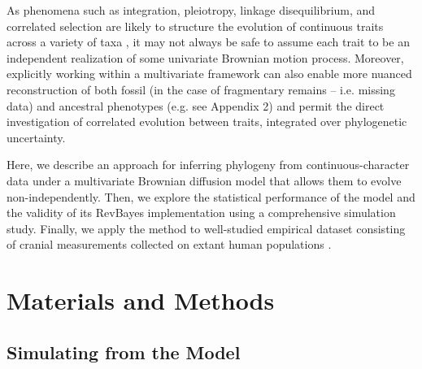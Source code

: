 \documentclass[10pt, twocolumn, twoside]{article}
\begin{document}
As phenomena such as integration, pleiotropy, linkage disequilibrium, and correlated selection are likely to structure the evolution of continuous traits \citep{cheverudDevelopmentalIntegrationEvolution1996, youngEvolutionaryPersistencePhenotypic2006, mitteroeckerConceptualStatisticalRelationship2007, klingenbergMorphologicalIntegrationDevelopmental2008, klingenbergStudyingMorphologicalIntegration2014} across a variety of taxa \citep[e.g.][]{parsonsConstraintOpportunityGenetic2011, klingenbergDevelopmentalPlasticityMorphological2012, neauxBasicraniumFaceAssessing2018}, it may not always be safe to assume each trait to be an independent realization of some univariate Brownian motion process.  Moreover, explicitly working within a multivariate framework can also enable more nuanced reconstruction of both fossil (in the case of fragmentary remains – i.e. missing data) and ancestral phenotypes (e.g. see Appendix 2) and permit the direct investigation of correlated evolution between traits, integrated over phylogenetic uncertainty.

Here, we describe an approach for inferring phylogeny from continuous-character data under a multivariate Brownian diffusion model that allows them to evolve non-independently. Then, we explore the statistical performance of the model and the validity of its RevBayes \citep{hohnaRevBayesBayesianPhylogenetic2016a} implementation using a comprehensive simulation study. Finally, we apply the method to well-studied empirical dataset consisting of cranial measurements collected on extant human populations \citep{howellsCranialVariationMan1973, howellsSkullShapesMap1989, howellsWhoWhoSkulls1995}. 

\clearpage

\section{Materials and Methods}

\subsection{Simulating from the Model}
\end{document}
